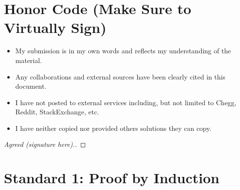 \documentclass[11pt]{article}
\theoremstyle{definition}
\theoremstyle{definition}
\newtheorem{required}{Problem}
\theoremstyle{definition}
\begin{document}
\section{Honor Code (Make Sure to Virtually Sign)} \label{HonorCode}

\begin{itemize}
\item My submission is in my own words and reflects my understanding of the material.
\item Any collaborations and external sources have been clearly cited in this document.
\item I have not posted to external services including, but not limited to Chegg, Reddit, StackExchange, etc.
\item I have neither copied nor provided others solutions they can copy.
\end{itemize}


\begin{proof}[Agreed (signature here).]
\end{proof}


\newpage
\section{Standard 1: Proof by Induction}
\end{document}
